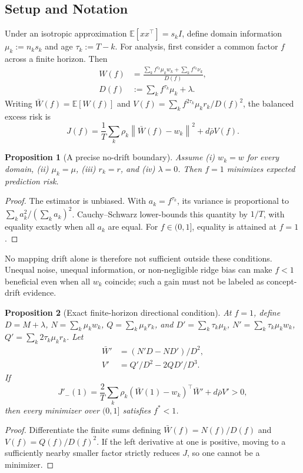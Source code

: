 \documentclass[10pt]{article}
\newtheorem{proposition}{Proposition}
\newcommand{\E}{\mathbb{E}}
\newcommand{\norm}[1]{\left\|#1\right\|}
\begin{document}
\subsection{Setup and Notation}

Under an isotropic approximation $\E[xx^\top] = s_k I$, define domain
information $\mu_k := n_k s_k$ and age $\tau_k := T-k$.  For analysis,
first consider a common factor $f$ across a finite horizon.  Then
\begin{equation}
  \begin{aligned}
    W(f)&=\frac{\sum_k f^{\tau_k}\mu_kw_k+\sum_kf^{\tau_k}\nu_k}
                 {D(f)},\\
    D(f)&:=\sum_kf^{\tau_k}\mu_k+\lambda .
  \end{aligned}
\end{equation}
Writing $\bar W(f)=\E[W(f)]$ and
$V(f)=\sum_kf^{2\tau_k}\mu_kr_k/D(f)^2$, the balanced excess risk is
\begin{equation}
  J(f)=\frac1T\sum_k\rho_k\norm{\bar W(f)-w_k}^2
       +d\bar\rho V(f).
\end{equation}

\begin{proposition}[A precise no-drift boundary]
\label{prop:fstar1}
Assume (i) $w_k=w$ for every domain, (ii) $\mu_k=\mu$,
(iii) $r_k=r$, and (iv) $\lambda=0$.  Then $f=1$ minimizes expected
prediction risk.
\end{proposition}
\begin{proof}
The estimator is unbiased.  With $a_k=f^{\tau_k}$, its variance is
proportional to $\sum_ka_k^2/(\sum_ka_k)^2$.  Cauchy--Schwarz lower-bounds
this quantity by $1/T$, with equality exactly when all $a_k$ are equal.
For $f\in(0,1]$, equality is attained at $f=1$.
\end{proof}

No mapping drift alone is therefore not sufficient outside these conditions.
Unequal noise, unequal information, or non-negligible ridge bias can make
$f<1$ beneficial even when all $w_k$ coincide; such a gain must not be labeled
as concept-drift evidence.

\begin{proposition}[Exact finite-horizon directional condition]
\label{prop:fstar_lt1}
At $f=1$, define $D=M+\lambda$, $N=\sum_k\mu_kw_k$,
$Q=\sum_k\mu_kr_k$, and
$D'=\sum_k\tau_k\mu_k$, $N'=\sum_k\tau_k\mu_kw_k$,
$Q'=\sum_k2\tau_k\mu_kr_k$.  Let
\begin{align}
 \bar W' &= (N'D-ND')/D^2,\\
 V' &= Q'/D^2-2QD'/D^3.
\end{align}
If
\begin{equation}
 J'_-(1)=\frac2T\sum_k\rho_k(\bar W(1)-w_k)^\top\bar W'
          +d\bar\rho V' >0,
 \label{eq:suff_cond}
\end{equation}
then every minimizer over $(0,1]$ satisfies $f^*<1$.
\end{proposition}
\begin{proof}
Differentiate the finite sums defining $\bar W(f)=N(f)/D(f)$ and
$V(f)=Q(f)/D(f)^2$.  If the left derivative at one is positive, moving to a
sufficiently nearby smaller factor strictly reduces $J$, so one cannot be a
minimizer.
\end{proof}
\end{document}
